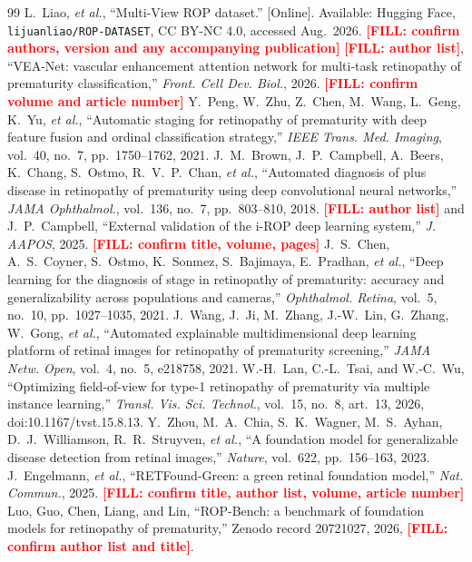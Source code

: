 \documentclass[journal]{IEEEtran}
\newcommand{\FILL}[1]{\textcolor{red}{\textbf{[FILL: #1]}}}
\begin{document}
\begin{thebibliography}{99}
 L.~Liao, \emph{et al.}, ``Multi-View ROP dataset.'' [Online]. Available: Hugging Face, \texttt{lijuanliao/ROP-DATASET}, CC BY-NC 4.0, accessed Aug.\ 2026. \FILL{confirm authors, version and any accompanying publication}
 \FILL{author list}, ``VEA-Net: vascular enhancement attention network for multi-task retinopathy of prematurity classification,'' \emph{Front. Cell Dev. Biol.}, 2026. \FILL{confirm volume and article number}
 Y.~Peng, W.~Zhu, Z.~Chen, M.~Wang, L.~Geng, K.~Yu, \emph{et al.}, ``Automatic staging for retinopathy of prematurity with deep feature fusion and ordinal classification strategy,'' \emph{IEEE Trans. Med. Imaging}, vol.~40, no.~7, pp.~1750--1762, 2021.
 J.~M.~Brown, J.~P.~Campbell, A.~Beers, K.~Chang, S.~Ostmo, R.~V.~P.~Chan, \emph{et al.}, ``Automated diagnosis of plus disease in retinopathy of prematurity using deep convolutional neural networks,'' \emph{JAMA Ophthalmol.}, vol.~136, no.~7, pp.~803--810, 2018.
 \FILL{author list} and J.~P.~Campbell, ``External validation of the i-ROP deep learning system,'' \emph{J. AAPOS}, 2025. \FILL{confirm title, volume, pages}
 J.~S.~Chen, A.~S.~Coyner, S.~Ostmo, K.~Sonmez, S.~Bajimaya, E.~Pradhan, \emph{et al.}, ``Deep learning for the diagnosis of stage in retinopathy of prematurity: accuracy and generalizability across populations and cameras,'' \emph{Ophthalmol. Retina}, vol.~5, no.~10, pp.~1027--1035, 2021.
 J.~Wang, J.~Ji, M.~Zhang, J.-W.~Lin, G.~Zhang, W.~Gong, \emph{et al.}, ``Automated explainable multidimensional deep learning platform of retinal images for retinopathy of prematurity screening,'' \emph{JAMA Netw. Open}, vol.~4, no.~5, e218758, 2021.
 W.-H.~Lan, C.-L.~Tsai, and W.-C.~Wu, ``Optimizing field-of-view for type-1 retinopathy of prematurity via multiple instance learning,'' \emph{Transl. Vis. Sci. Technol.}, vol.~15, no.~8, art.~13, 2026, doi:10.1167/tvst.15.8.13.
 Y.~Zhou, M.~A.~Chia, S.~K.~Wagner, M.~S.~Ayhan, D.~J.~Williamson, R.~R.~Struyven, \emph{et al.}, ``A foundation model for generalizable disease detection from retinal images,'' \emph{Nature}, vol.~622, pp.~156--163, 2023.
 J.~Engelmann, \emph{et al.}, ``RETFound-Green: a green retinal foundation model,'' \emph{Nat. Commun.}, 2025. \FILL{confirm title, author list, volume, article number}
 Luo, Guo, Chen, Liang, and Lin, ``ROP-Bench: a benchmark of foundation models for retinopathy of prematurity,'' Zenodo record 20721027, 2026, \FILL{confirm author list and title}.

\end{thebibliography}
\end{document}
